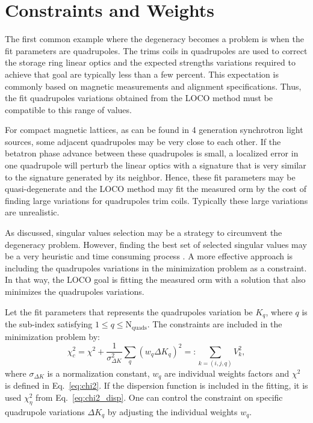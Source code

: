 \section{Constraints and Weights}\label{sec:constraint}
The first common example where the degeneracy becomes a problem is when the fit parameters are quadrupoles. The trims coils in quadrupoles are used to correct the storage ring linear optics and the expected strengths variations required to achieve that goal are typically less than a few percent. This expectation is commonly based on magnetic measurements and alignment specifications. Thus, the fit quadrupoles variations obtained from the LOCO method must be compatible to this range of values. 

For compact magnetic lattices, as can be found in 4 generation synchrotron light sources, some adjacent quadrupoles may be very close to each other. If the betatron phase advance between these quadrupoles is small, a localized error in one quadrupole will perturb the linear optics with a signature that is very similar to the signature generated by its neighbor. Hence, these fit parameters may be quasi-degenerate and the LOCO method may fit the measured \gls{orm} by the cost of finding large variations for quadrupoles trim coils. Typically these large variations are unrealistic.

As discussed, singular values selection may be a strategy to circumvent the degeneracy problem. However, finding the best set of selected singular values may be a very heuristic and time consuming process \cite{icfa_laurent}. A more effective approach is including the quadrupoles variations in the minimization problem as a constraint. In that way, the LOCO goal is fitting the measured \gls{orm} with a solution that also minimizes the quadrupoles variations. 

Let the fit parameters that represents the quadrupoles variation be $K_{q}$, where $q$ is the sub-index satisfying $1 \leq q \leq \mathrm{N}_{\mathrm{quads}}$. The constraints are included in the minimization problem by:
\begin{equation}
    \chi^2_{c} = \chi^2 + \dfrac{1}{\sigma_{\Delta K}^2}\sum_q \left(w_q \Delta K_q\right)^2 =: \sum_{{k = (i,j, q)}} V_{k}^2,
    \label{eq:chi2_constraint}
\end{equation}
where $\sigma_{\Delta K}$ is a normalization constant, $w_q$ are individual weights factors and $\chi^2$ is defined in Eq.~\eqref{eq:chi2}. If the dispersion function is included in the fitting, it is used $\chi^2_{\eta}$ from Eq.~\eqref{eq:chi2_disp}. One can control the constraint on specific quadrupole variations $\Delta K_q$ by adjusting the individual weights $w_q$.

